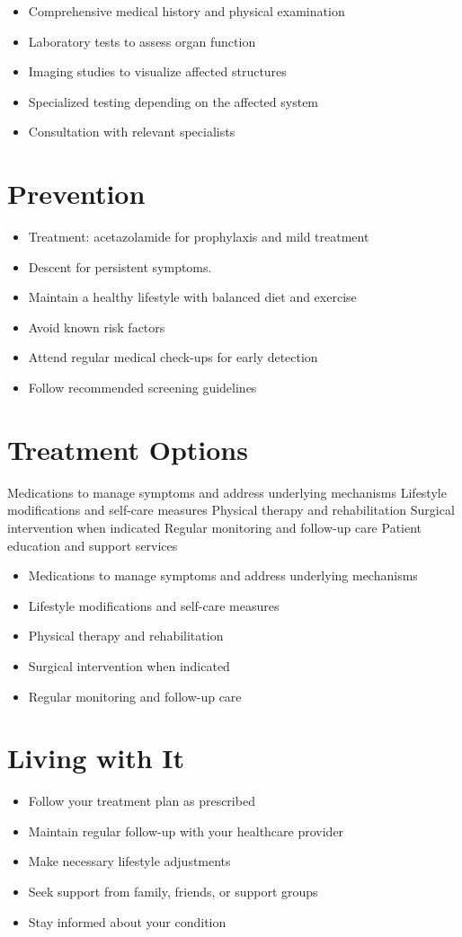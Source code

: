 \begin{itemize}[noitemsep]
  \item Comprehensive medical history and physical examination
  \item Laboratory tests to assess organ function
  \item Imaging studies to visualize affected structures
  \item Specialized testing depending on the affected system
  \item Consultation with relevant specialists
\end{itemize}
\section{Prevention}
\begin{itemize}[noitemsep]
  \item Treatment: acetazolamide for prophylaxis and mild treatment
  \item Descent for persistent symptoms.
  \item Maintain a healthy lifestyle with balanced diet and exercise
  \item Avoid known risk factors
  \item Attend regular medical check-ups for early detection
  \item Follow recommended screening guidelines
\end{itemize}
\section{Treatment Options}
Medications to manage symptoms and address underlying mechanisms Lifestyle modifications and self-care measures Physical therapy and rehabilitation Surgical intervention when indicated Regular monitoring and follow-up care Patient education and support services

\begin{itemize}[noitemsep]
  \item Medications to manage symptoms and address underlying mechanisms
  \item Lifestyle modifications and self-care measures
  \item Physical therapy and rehabilitation
  \item Surgical intervention when indicated
  \item Regular monitoring and follow-up care
\end{itemize}
\section{Living with It}
\begin{itemize}[noitemsep]
  \item Follow your treatment plan as prescribed
  \item Maintain regular follow-up with your healthcare provider
  \item Make necessary lifestyle adjustments
  \item Seek support from family, friends, or support groups
  \item Stay informed about your condition
\end{itemize}
